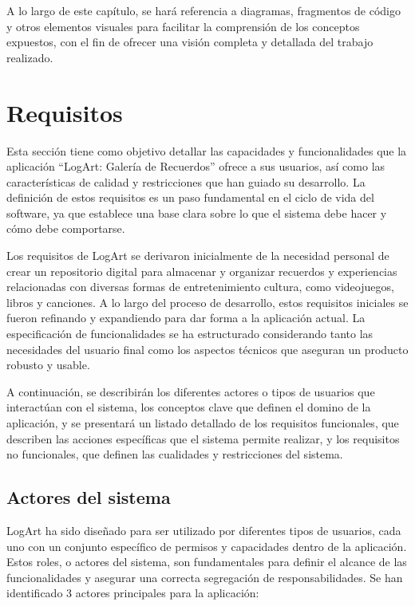 A lo largo de este capítulo, se hará referencia a diagramas, fragmentos de código y otros elementos visuales para facilitar la comprensión de los conceptos expuestos, con el fin de ofrecer una visión completa y detallada del trabajo realizado.

\section{Requisitos}
\label{sec:requisitos}

Esta sección tiene como objetivo detallar las capacidades y funcionalidades que la aplicación ``LogArt: Galería de Recuerdos'' ofrece a sus usuarios, así como las características de calidad y restricciones que han guiado su desarrollo. La definición de estos requisitos es un paso fundamental en el ciclo de vida del software, ya que establece una base clara sobre lo que el sistema debe hacer y cómo debe comportarse.

Los requisitos de LogArt se derivaron inicialmente de la necesidad personal de crear un repositorio digital para almacenar y organizar recuerdos y experiencias relacionadas con diversas formas de entretenimiento cultura, como videojuegos, libros y canciones. A lo largo del proceso de desarrollo, estos requisitos iniciales se fueron refinando y expandiendo para dar forma a la aplicación actual. La especificación de funcionalidades se ha estructurado considerando tanto las necesidades del usuario final como los aspectos técnicos que aseguran un producto robusto y usable.

A continuación, se describirán los diferentes actores o tipos de usuarios que interactúan con el sistema, los conceptos clave que definen el domino de la aplicación, y se presentará un listado detallado de los requisitos funcionales, que describen las acciones específicas que el sistema permite realizar, y los requisitos no funcionales, que definen las cualidades y restricciones del sistema.

\subsection{Actores del sistema}
\label{ssec:actoresSistema}

LogArt ha sido diseñado para ser utilizado por diferentes tipos de usuarios, cada uno con un conjunto específico de permisos y capacidades dentro de la aplicación. Estos roles, o actores del sistema, son fundamentales para definir el alcance de las funcionalidades y asegurar una correcta segregación de responsabilidades. Se han identificado 3 actores principales para la aplicación:

